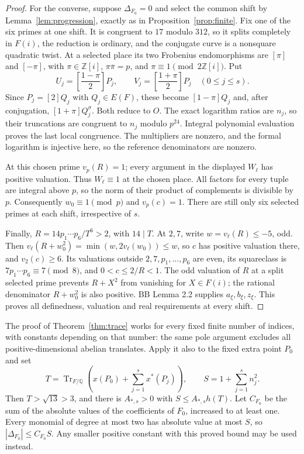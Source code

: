 \documentclass[11pt,a4paper]{article}
\newcommand{\Q}{\mathbb Q}\newcommand{\Z}{\mathbb Z}
\DeclareMathOperator{\Tr}{Tr}\DeclareMathOperator{\Num}{Num}
\begin{document}
\begin{proof}
For the converse, suppose $\Delta_{F_0}=0$ and select the common
shift by Lemma~\ref{lem:progression}, exactly as in
Proposition~\ref{prop:finite}. Fix one of the six primes at one
shift. It is congruent to $17$ modulo $312$, so it splits completely
in $F(i)$, the reduction is ordinary, and the conjugate curve is a
nonsquare quadratic twist. At a selected place its two Frobenius
endomorphisms are $[\pi]$ and $[-\pi]$, with
$\pi\in\Z[i]$, $\pi\overline\pi=p$, and
$\pi\equiv1\pmod{2\Z[i]}$. Put
\[
 U_j=\left[\frac{1-\pi}{2}\right]P_j,
 \qquad V_j=\left[\frac{1+\pi}{2}\right]P_j
 \quad(0\le j\le s).
\]
Since $P_j=[2]Q_j$ with $Q_j\in E(F)$, these become
$[1-\pi]Q_j$ and, after conjugation, $[1+\pi]Q_j^\sigma$.
Both reduce to $O$. The exact logarithm ratios are $n_j$, so their
truncations are congruent to $n_j$ modulo $p^{24}$. Integral
polynomial evaluation proves the last local congruence. The
multipliers are nonzero, and the formal logarithm is injective here,
so the reference denominators are nonzero.

At this chosen prime $v_p(R)=1$; every argument in the displayed
$W_\ell$ has positive valuation. Thus $W_\ell\equiv1$ at the
chosen place. All factors for every tuple are integral above $p$,
so the norm of their product of complements is divisible by $p$.
Consequently $w_0\equiv1\pmod p$ and $v_p(c)=1$. There are still
only six selected primes at each shift, irrespective of $s$.

Finally, $R=14p_1\cdots p_6/T^6>2$, with $14\mid T$. At $2,7$,
write $w=v_\ell(R)\le-5$, odd. Then
$v_\ell(R+w_0^2)=\min(w,2v_\ell(w_0))\le w$, so $c$ has
positive valuation there, and $v_2(c)\ge6$. Its valuations outside
$2,7,p_1,\ldots,p_6$ are even, its squareclass is
$7p_1\cdots p_6\equiv7\pmod8$, and $0<c\le2/R<1$.
The odd valuation of $R$ at a split selected prime prevents
$R+X^2$ from vanishing for $X\in F(i)$; the rational denominator
$R+w_0^2$ is also positive. BB Lemma 2.2 supplies
$a_\xi,b_\xi,z_\xi$. This proves all definedness, valuation and
real requirements at every shift.
\end{proof}

The proof of Theorem~\ref{thm:trace} works for every fixed finite
number of indices, with constants depending on that number: the same
pole argument excludes all positive-dimensional abelian translates.
Apply it also to the fixed extra point $P_0$ and set
\[
 T=\Tr_{F/\Q}\left(x(P_0)+\sum_{j=1}^{s}x^*(P_j)\right),
 \qquad S=1+\sum_{j=1}^{s}n_j^2.
\]
Then $T>\sqrt{13}>3$, and there is $A_{*,s}>0$ with
$S\le A_{*,s}h(T)$. Let $C_{F_0}$ be the sum of the absolute
values of the coefficients of $F_0$, increased to at least one.
Every monomial of degree at most two has absolute value at most $S$,
so $|\Delta_{F_0}|\le C_{F_0}S$. Any smaller positive constant
with this proved bound may be used instead.
\end{document}
